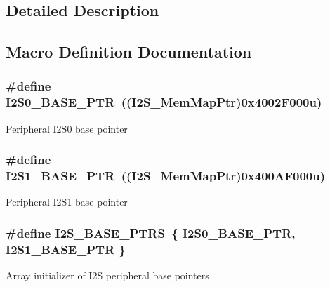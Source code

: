 \subsection{Detailed Description}


\subsection{Macro Definition Documentation}
\hypertarget{group___i2_s___peripheral_ga2eac5d85244610150239927c71b2e147}{}
\subsubsection[{I2\+S0\+\_\+\+B\+A\+S\+E\+\_\+\+P\+T\+R}]{\setlength{\rightskip}{0pt plus 5cm}\#define I2\+S0\+\_\+\+B\+A\+S\+E\+\_\+\+P\+T\+R~(({\bf I2\+S\+\_\+\+Mem\+Map\+Ptr})0x4002\+F000u)}\label{group___i2_s___peripheral_ga2eac5d85244610150239927c71b2e147}
Peripheral I2\+S0 base pointer \hypertarget{group___i2_s___peripheral_ga1a9b2077128eb723b292b14fea26b83f}{}
\subsubsection[{I2\+S1\+\_\+\+B\+A\+S\+E\+\_\+\+P\+T\+R}]{\setlength{\rightskip}{0pt plus 5cm}\#define I2\+S1\+\_\+\+B\+A\+S\+E\+\_\+\+P\+T\+R~(({\bf I2\+S\+\_\+\+Mem\+Map\+Ptr})0x400\+A\+F000u)}\label{group___i2_s___peripheral_ga1a9b2077128eb723b292b14fea26b83f}
Peripheral I2\+S1 base pointer \hypertarget{group___i2_s___peripheral_gad4496321b78d6de21d7434afb80480b5}{}
\subsubsection[{I2\+S\+\_\+\+B\+A\+S\+E\+\_\+\+P\+T\+R\+S}]{\setlength{\rightskip}{0pt plus 5cm}\#define I2\+S\+\_\+\+B\+A\+S\+E\+\_\+\+P\+T\+R\+S~\{ {\bf I2\+S0\+\_\+\+B\+A\+S\+E\+\_\+\+P\+T\+R}, {\bf I2\+S1\+\_\+\+B\+A\+S\+E\+\_\+\+P\+T\+R} \}}\label{group___i2_s___peripheral_gad4496321b78d6de21d7434afb80480b5}
Array initializer of I2\+S peripheral base pointers 

